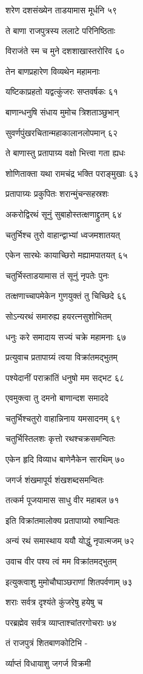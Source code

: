 शरेण दशसंख्येन ताडयामास मूर्धनि ५९

ते बाणा राजपुत्रस्य ललाटे परिनिष्ठिताः

विराजंते स्म च मुने दशशाखास्तरोरिव ६०

तेन बाणप्रहारेण विव्यथेन महामनाः

यष्टिकाप्रहतो यद्वत्कुंजरः सप्तवर्षकः ६१

बाणान्धनुषि संधाय मुमोच त्रिशताञ्छुभान्

सुवर्णपुंखरचितान्महाकालानलोपमान् ६२

ते बाणास्तु प्रतापाग्र्य वक्षो भित्त्वा गता ह्यधः

शोणिताक्ता यथा रामचंद्र भक्ति पराङ्मुखाः ६३

प्रतापाग्र्यः प्रकुपितः शरान्मुंचन्सहस्रशः

अकरोद्विरथं सूनुं सुबाहोस्तत्क्षणाद्द्रुतम् ६४

चतुर्भिश्च तुरो वाहान्द्वाभ्यां ध्वजमशातयत्

एकेन सारथेः कायाच्छिरो मह्यामपातयत् ६५

चतुर्भिस्ताडयामास तं सूनुं नृपतेः पुनः

तत्क्षणाच्चापमेकेन गुणयुक्तं तु चिच्छिदे ६६

सोऽन्यरथं समारुह्य हयरत्नसुशोभितम्

धनुः करे समादाय सज्यं चक्रे महामनाः ६७

प्रत्युवाच प्रतापाग्र्यं त्वया विक्रांतमद्भुतम्

पश्येदानीं पराक्रांतिं धनुषो मम सद्भट ६८

एवमुक्त्वा तु दमनो बाणान्दश समाददे

चतुर्भिश्चतुरो वाहान्निनाय यमसादनम् ६९

चतुर्भिस्तिलशः कृत्तो रथश्चक्रसमन्वितः

एकेन हृदि विव्याध बाणेनैकेन सारथिम् ७०

जगर्ज शंखमापूर्य शंखशब्दसमन्वितः

तत्कर्म पूजयामास साधु वीर महाबल ७१

इति विक्रांतमालोक्य प्रतापाग्र्यो रुषान्वितः

अन्यं रथं समास्थाय ययौ योद्धुं नृपात्मजम् ७२

उवाच वीर पश्य त्वं मम विक्रांतमद्भुतम्

इत्युक्त्वाशु मुमोचौघाञ्छराणां शितपर्वणाम् ७३

शराः सर्वत्र दृश्यंते कुंजरेषु हयेषु च

परब्रह्मेव सर्वत्र व्याप्ताश्चांतरगोचराः ७४

तं राजपुत्रं शितबाणकोटिभि -

र्व्याप्तं विधायाशु जगर्ज विक्रमी

